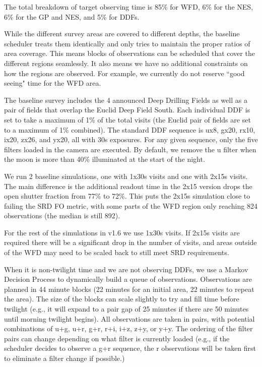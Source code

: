 The total breakdown of target observing time is 85\% for WFD, 6\% for the NES, 6\% for the GP and NES, and 5\% for DDFs.


While the different survey areas are covered to different depths, the baseline scheduler treats them identically and only tries to maintain the proper ratios of area coverage. This means blocks of observations can be scheduled that cover the different regions seamlessly. It also means we have no additional constraints on how the regions are observed. For example, we currently do not reserve ``good seeing" time for the WFD area. 

The baseline survey includes the 4 announced Deep Drilling Fields as well as a pair of fields that overlap the Euclid Deep Field South.  Each individual DDF is set to take a maximum of 1\% of the total visits (the Euclid pair of fields are set to a maximum of 1\% combined). The standard DDF sequence is ux8, gx20, rx10, ix20, zx26, and yx20, all with 30s exposures. For any given sequence, only the five filters loaded in the camera are executed. By default, we remove the u filter when the moon is more than 40\% illuminated at the start of the night. 


We run 2 baseline simulations, one with 1x30s visits and one with 2x15s visits.  The main difference is the additional readout time in the 2x15 version drops the open shutter fraction from 77\% to 72\%. This puts the 2x15s simulation close to failing the SRD FO metric, with some parts of the WFD region only reaching 824 observations (the median is still 892). 

For the rest of the simulations in v1.6 we use 1x30s visits.  If 2x15s visits are required there will be a significant drop in the number of visits, and areas outside of the WFD may need to be scaled back to still meet SRD requirements.

When it is non-twilight time and we are not observing DDFs, we use a Markov Decision Process to dynamically build a queue of observations.  Observations are planned in 44 minute blocks (22 minutes for an initial area, 22 minutes to repeat the area). The size of the blocks can scale slightly to try and fill time before twilight (e.g., it will expand to a pair gap of 25 minutes if there are 50 minutes until morning twilight begins). All observations are taken in pairs, with potential combinations of u+g, u+r, g+r, r+i, i+z, z+y, or y+y. The ordering of the filter pairs can change depending on what filter is currently loaded (e.g., if the scheduler decides to observe a g+r sequence, the r observations will be taken first to eliminate a filter change if possible.)

